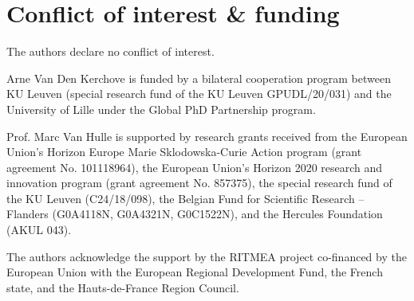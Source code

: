 \chapter*{Conflict of interest \& funding}
The authors declare no conflict of interest.

Arne Van Den Kerchove is funded by a bilateral cooperation program between KU
Leuven (special research fund of the KU Leuven GPUDL/20/031) and the University
of Lille under the Global PhD Partnership program.

Prof. Marc Van Hulle is supported by research grants received from
the European Union’s Horizon Europe Marie Sklodowska-Curie Action program
(grant agreement No. 101118964), the European Union’s Horizon 2020 research and
innovation program (grant agreement No. 857375), the special research fund of
the KU Leuven (C24/18/098), the Belgian Fund for Scientific Research – Flanders
(G0A4118N, G0A4321N, G0C1522N), and the Hercules
Foundation (AKUL 043).

The authors acknowledge the support by the RITMEA project co-financed by the
European Union with the European Regional Development Fund, the French state,
and the Hauts-de-France Region Council.
